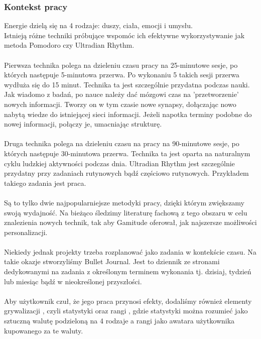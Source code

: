 \documentclass[a4paper,11pt]{report}
\begin{document}
\subsubsection{Kontekst pracy}
Energie\cite{Harward} dzielą się na 4 rodzaje: duszy, ciała, emocji i umysłu.
\\Istnieją różne techniki próbujące wspomóc ich efektywne wykorzystywanie jak metoda Pomodoro\cite{Pomodoro}\cite{pomodoro_} czy Ultradian Rhythm\cite{90/30}\cite{ultradianRhytm1}\cite{ultradianRhytm2}\cite{ultradianRhytm3}.
\\\\Pierwsza technika polega na dzieleniu czasu pracy na 25-minutowe sesje, po których następuje 5-minutowa przerwa.
 Po wykonaniu 5 takich sesji przerwa wydłuża się do 15 minut.
 Technika ta jest szczególnie przydatna podczas nauki.
\\Jak wiadomo z badań, po nauce należy dać mózgowi czas na 'przetworzenie' nowych informacji.
 Tworzy on w tym czasie nowe synapsy, dołączając nowo nabytą wiedze do istniejącej sieci informacji.
 Jeżeli napotka terminy podobne do nowej informacji, połączy je,  umacniając strukturę. 
\\\\Druga technika polega na dzieleniu czasu na pracy na 90-minutowe sesje, po których następuje 30-minutowa przerwa.
 Technika ta jest oparta na naturalnym cyklu ludzkiej aktywności podczas dnia.
 Ultradian Rhythm jest szczególnie przydatny przy zadaniach rutynowych bądź częściowo rutynowych.
 Przykładem takiego zadania jest praca.
\\\\Są to tylko dwie najpopularniejsze metodyki pracy, dzięki którym zwiększamy swoją wydajność. 
Na bieżąco śledzimy literaturę fachową z tego obszaru w celu znalezienia nowych technik,
 tak aby Gamitude oferował, jak najszersze możliwości personalizacji. 
\\\\Niekiedy jednak projekty trzeba rozplanować jako zadania w kontekście czasu.
 Na takie okazje stworzyliśmy Bullet Journal\cite{bulletJournal}.
 Jest to dziennik ze stronami dedykowanymi na zadania z określonym terminem wykonania tj. dzisiaj, tydzień lub miesiąc bądź w nieokreślonej przyszłości.
\\\\Aby użytkownik czuł, że jego praca przynosi efekty, dodaliśmy również elementy grywalizacji \cite{grywalizacja}, czyli 
 statystyki oraz rangi \cite{rangi}, gdzie statystyki można rozumieć jako sztuczną walutę podzieloną na 4 rodzaje a rangi 
 jako awatara użytkownika kupowanego za te waluty.
\end{document}
